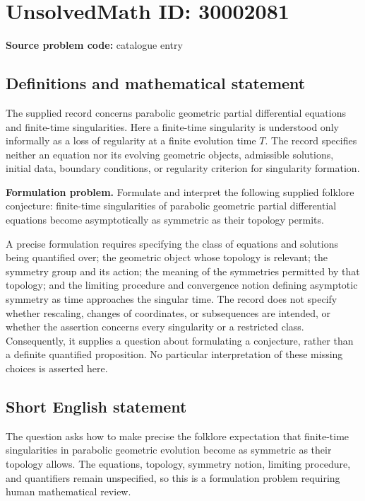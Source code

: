 \documentclass[11pt]{article}
\begin{document}
\section*{UnsolvedMath ID: 30002081}
\textbf{Source problem code:} catalogue entry
\subsection{Definitions and mathematical statement}
The supplied record concerns parabolic geometric partial differential equations and finite-time singularities. Here a finite-time singularity is understood only informally as a loss of regularity at a finite evolution time \(T\). The record specifies neither an equation nor its evolving geometric objects, admissible solutions, initial data, boundary conditions, or regularity criterion for singularity formation.

\textbf{Formulation problem.} Formulate and interpret the following supplied folklore conjecture: finite-time singularities of parabolic geometric partial differential equations become asymptotically as symmetric as their topology permits.

A precise formulation requires specifying the class of equations and solutions being quantified over; the geometric object whose topology is relevant; the symmetry group and its action; the meaning of the symmetries permitted by that topology; and the limiting procedure and convergence notion defining asymptotic symmetry as time approaches the singular time. The record does not specify whether rescaling, changes of coordinates, or subsequences are intended, or whether the assertion concerns every singularity or a restricted class. Consequently, it supplies a question about formulating a conjecture, rather than a definite quantified proposition. No particular interpretation of these missing choices is asserted here.
\subsection{Short English statement}
The question asks how to make precise the folklore expectation that finite-time singularities in parabolic geometric evolution become as symmetric as their topology allows. The equations, topology, symmetry notion, limiting procedure, and quantifiers remain unspecified, so this is a formulation problem requiring human mathematical review.
\end{document}
